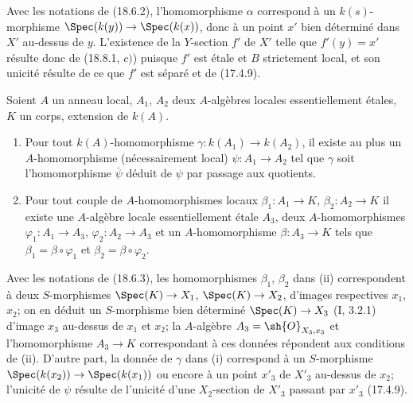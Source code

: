 Avec les notations de (18.6.2), l'homomorphisme $\alpha$ correspond à un $k(s)$-morphisme $\Spec(k(y))\to\Spec(k(x))$, donc à un point $x'$ bien déterminé dans $X'$ au-dessus de $y$. L'existence de la $Y$-section $f'$ de $X'$ telle que $f'(y)=x'$ résulte donc de (18.8.1, $c)$) puisque $f'$ est étale et $B$ strictement local, et son unicité résulte de ce que $f'$ est séparé et de (17.4.9).

\begin{lemma}[18.8.5]
\label{IV.18.8.5}
Soient $A$ un anneau local, $A_1$, $A_2$ deux $A$-algèbres locales essentiellement étales, $K$ un corps, extension de $k(A)$.
\begin{enumerate}
  \item[(i)] Pour tout $k(A)$-homomorphisme $\gamma:k(A_1)\to k(A_2)$, il existe au plus un $A$-homomorphisme (nécessairement local) $\psi:A_1\to A_2$ tel que $\gamma$ soit l'homomorphisme $\overline\psi$ déduit de $\psi$ par passage aux quotients.
  \item[(ii)] Pour tout couple de $A$-homomorphismes locaux $\beta_1:A_1\to K$, $\beta_2:A_2\to K$ il existe une $A$-algèbre locale essentiellement étale $A_3$, deux $A$-homomorphismes $\varphi_1:A_1\to A_3$, $\varphi_2:A_2\to A_3$ et un $A$-homomorphisme $\beta:A_3\to K$ tels que $\beta_1=\beta\circ\varphi_1$ et $\beta_2=\beta\circ\varphi_2$.
\end{enumerate}
\end{lemma}

Avec les notations de (18.6.3), les homomorphismes $\beta_1$, $\beta_2$ dans (ii) correspondent à deux $S$-morphismes $\Spec(K)\to X_1$, $\Spec(K)\to X_2$, d'images respectives $x_1$, $x_2$; on en déduit un $S$-morphisme bien déterminé $\Spec(K)\to X_3$ (I, 3.2.1) d'image $x_3$ au-dessus de $x_1$ et $x_2$; la $A$-algèbre $A_3=\sh{O}_{X_3,x_3}$ et l'homomorphisme $A_3\to K$ correspondant à ces données répondent aux conditions de (ii). D'autre part, la donnée de $\gamma$ dans (i) correspond à un $S$-morphisme $\Spec(k(x_2))\to\Spec(k(x_1))$ ou encore à un point $x'_3$ de $X'_3$ au-dessus de $x_2$; l'unicité de $\psi$ résulte de l'unicité d'une $X_2$-section de $X'_3$ passant par $x'_3$ (17.4.9).

